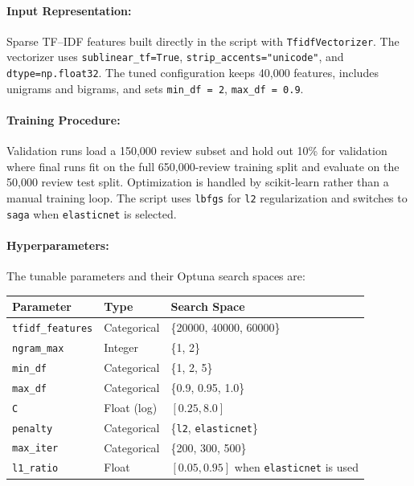 \documentclass[12pt]{article}
\begin{document}
\paragraph{Input Representation:}
Sparse TF--IDF features built directly in the script with \texttt{TfidfVectorizer}. The vectorizer uses \texttt{sublinear\_tf=True}, \texttt{strip\_accents="unicode"}, and \texttt{dtype=np.float32}. The tuned configuration keeps 40,000 features, includes unigrams and bigrams, and sets \texttt{min\_df = 2}, \texttt{max\_df = 0.9}.


\paragraph{Training Procedure:}
Validation runs load a 150,000 review subset and hold out 10\% for validation where final runs fit on the full 650,000-review training split and evaluate on the 50,000 review test split. Optimization is handled by scikit-learn rather than a manual training loop. The script uses \texttt{lbfgs} for \texttt{l2} regularization and switches to \texttt{saga} when \texttt{elasticnet} is selected.


\paragraph{Hyperparameters:}
The tunable parameters and their Optuna search spaces are:

\begin{table}[H]
    \centering
    \begin{tabular}{lll}
        \toprule
        Parameter & Type & Search Space \\
        \midrule
        \texttt{tfidf\_features} & Categorical & \{20000, 40000, 60000\} \\
        \texttt{ngram\_max} & Integer & \{1, 2\} \\
        \texttt{min\_df} & Categorical & \{1, 2, 5\} \\
        \texttt{max\_df} & Categorical & \{0.9, 0.95, 1.0\} \\
        \texttt{C} & Float (log) & $[0.25, 8.0]$ \\
        \texttt{penalty} & Categorical & \{\texttt{l2}, \texttt{elasticnet}\} \\
        \texttt{max\_iter} & Categorical & \{200, 300, 500\} \\
        \texttt{l1\_ratio} & Float & $[0.05, 0.95]$ when \texttt{elasticnet} is used \\
        \bottomrule
    \end{tabular}
\end{table}
\end{document}
